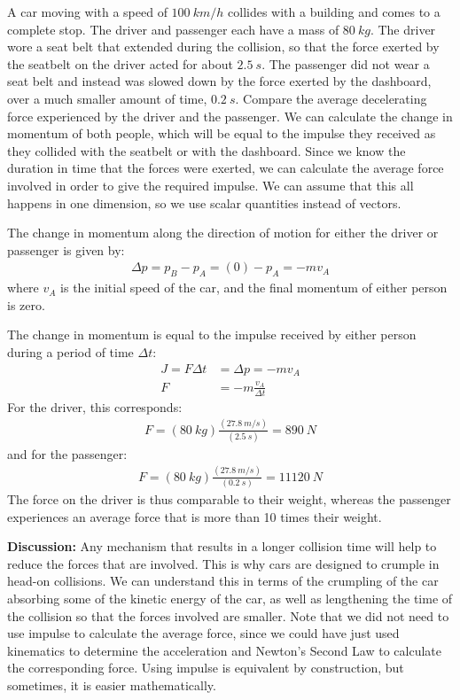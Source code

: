 \begin{example}{A car moving with a speed of $\SI{100}{km/h}$ collides with a building and comes to a complete stop. The driver and passenger each have a mass of $\SI{80}{kg}$. The driver wore a seat belt that extended during the collision, so that the force exerted by the seatbelt on the driver acted for about $\SI{2.5}{s}$. The passenger did not wear a seat belt and instead was slowed down by the force exerted by the dashboard, over a much smaller amount of time, $\SI{0.2}{s}$. Compare the average decelerating force experienced by the driver and the passenger.}
We can calculate the change in momentum of both people, which will be equal to the impulse they received as they collided with the seatbelt or with the dashboard. Since we know the duration in time that the forces were exerted, we can calculate the average force involved in order to give the required impulse. We can assume that this all happens in one dimension, so we use scalar quantities instead of vectors.

The change in momentum along the direction of motion for either the driver or passenger is given by:
\begin{align*}
\Delta p = p_B - p_A = (0)-p_A=-mv_A
\end{align*}
where $v_A$ is the initial speed of the car, and the final momentum of either person is zero. 

The change in momentum is equal to the impulse received by either person during a period of time $\Delta t$:
\begin{align*}
J=F\Delta t &= \Delta p = -mv_A\\
F&=-m \frac{v_A}{\Delta t}
\end{align*}
For the driver, this corresponds:
\begin{align*}
F=(\SI{80}{kg})\frac{(\SI{27.8}{m/s})}{(\SI{2.5}{s})}=\SI{890}{N}
\end{align*}
and for the passenger:
\begin{align*}
F=(\SI{80}{kg})\frac{(\SI{27.8}{m/s})}{(\SI{0.2}{s})}=\SI{11120}{N}
\end{align*}
The force on the driver is thus comparable to their weight, whereas the passenger experiences an average force that is more than 10 times their weight.

\textbf{Discussion:} Any mechanism that results in a longer collision time will help to reduce the forces that are involved. This is why cars are designed to crumple in head-on collisions. We can understand this in terms of the crumpling of the car absorbing some of the kinetic energy of the car, as well as lengthening the time of the collision so that the forces involved are smaller. Note that we did not need to use impulse to calculate the average force, since we could have just used kinematics to determine the acceleration and Newton's Second Law to calculate the corresponding force. Using impulse is equivalent by construction, but sometimes, it is easier mathematically.
\end{example}

